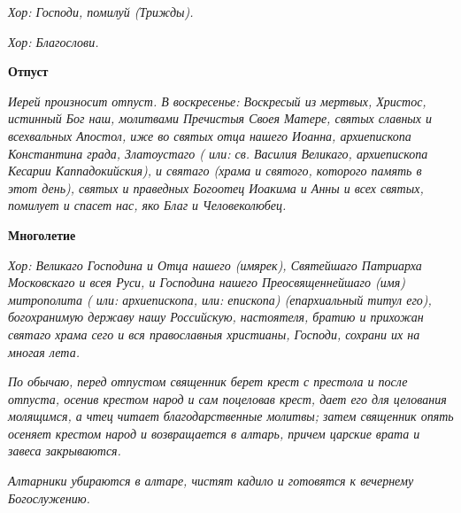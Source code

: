  \itshape Хор:\normalfont{} Господи, помилуй \itshape (Трижды).\normalfont{}


 \itshape Хор:\normalfont{} Благослови.



 

\bfseries  Отпуст\normalfont{}


 \itshape Иерей произносит отпуст. В воскресенье:\normalfont{} Воскресый из мертвых, Христос,
истинный Бог наш, молитвами Пречистыя Своея Матере, святых
славных и всехвальных Апостол, иже во святых отца нашего Иоанна,
архиепископа Константина града, Златоустаго ( \itshape или:\normalfont{} св. Василия
Великаго, архиепископа Кесарии Каппадокийския), и святаго \itshape (храма и
святого, которого память в этот день),\normalfont{} святых и праведных Богоотец
Иоакима и Анны и всех святых, помилует и спасет нас, яко Благ и
Человеколюбец.



 

\bfseries  Многолетие\normalfont{}


 \itshape Хор:\normalfont{} Великаго Господина и Отца нашего \itshape (имярек)\normalfont{}, Святейшаго Патриарха
Московскаго и всея Руси, и Господина нашего Преосвященнейшаго \itshape (имя)\normalfont{}
митрополита ( \itshape или:\normalfont{} архиепископа, \itshape или:\normalfont{} епископа) \itshape (епархиальный титул его),\normalfont{}
богохранимую державу нашу Российскую, настоятеля, братию и прихожан
святаго храма сего и вся православныя христианы, Господи, сохрани их на
многая лета.


 \itshape По обычаю, перед отпустом священник берет крест с престола и после
отпуста, осенив крестом народ и сам поцеловав крест, дает его для целования
молящимся, а чтец читает благодарственные молитвы; затем священник
опять осеняет крестом народ и возвращается в алтарь, причем царские врата
и завеса закрываются.\normalfont{}


 \itshape Алтарники убираются в алтаре, чистят кадило и готовятся к вечернему
Богослужению.\normalfont{}



\mychapterending